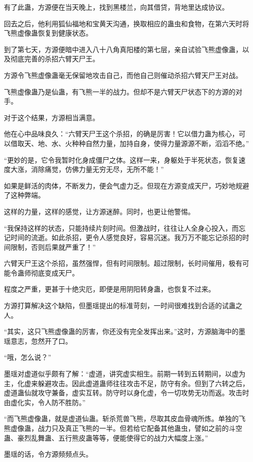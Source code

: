 \begin{this_body}
有了此蛊，方源便在当天晚上，找到黑楼兰，向其借贷，背地里达成协议。

回去之后，他利用狐仙福地和宝黄天沟通，换取相应的蛊虫和食物，在第六天时将飞熊虚像蛊恢复到健康状态。

到了第七天，方源便暗中进入八十八角真阳楼的第七层，亲自试验飞熊虚像蛊，以及彻底完善的杀招六臂天尸王。

方源令飞熊虚像蛊毫无保留地攻击自己，而他自己则催动杀招六臂天尸王对战。

飞熊虚像蛊乃是仙蛊，有飞熊一半的战力。但却不是六臂天尸状态下的方源的对手。

对于这个结果，方源相当满意。

他在心中品味良久：“六臂天尸王这个杀招，的确是厉害！它以借力蛊为核心，可以借取天、地、水、火种种自然力量，加持自身，使得力量源源不断，滔滔不绝。”

“更妙的是，它令我暂时化身成僵尸之体。这样一来，身躯处于半死状态，恢复速度大涨，消除痛觉，仿佛力量无穷无尽，无所不能！”

如果是鲜活的肉体，不断发力，便会气虚力乏。但现在方源变成天尸，巧妙地规避了这种弊端。

这样的力量，这样的感觉，让方源迷醉。同时，也更让他警惕。

“我保持这样的状态，只能持续片刻时间。但激战时，往往让人全身心投入，而忘记时间的流逝。如此杀招，更令人感觉良好，容易沉迷。我万万不能忘记杀招的时间限制，否则后果就严重了！”

六臂天尸王这个杀招，虽然强悍，但有时间限制。超过限制，长时间催用，极有可能令蛊师彻底变成天尸。

程度之严重，更甚于十绝灾厄，即便是用阴阳转身蛊，也恢复不过来。

方源打算解决这个缺陷，但墨瑶提出的标准苛刻，一时间很难找到合适的试蛊之人。

“其实，这只飞熊虚像蛊的厉害，你还没有完全发挥出来。”这时，方源脑海中的墨瑶意志，忽然开了口。

“哦，怎么说？”

墨瑶对虚道似乎颇有了解：“虚道，讲究虚实相生。前期一转到五转期间，以虚为主，化虚来躲避攻击。因此虚道蛊师往往攻击不足，防守有余。但到了六转之后，虚道蛊仙就攻守兼备，虚实互转。防守时以身化虚，令一切攻势无功而返。攻击时由虚化实，令人防不胜防。”

“而飞熊虚像蛊，就是虚道仙蛊。斩杀荒兽飞熊，尽取其皮血骨魂所炼。单独的飞熊虚像蛊，战力只及真正飞熊的一半。但若给它配备其他蛊虫，譬如之前的斗空蛊、豪烈乱舞蛊、五行熊皮蛊等等，便能使得它的战力大幅度上涨。”

墨瑶的话，令方源频频点头。


\end{this_body}
